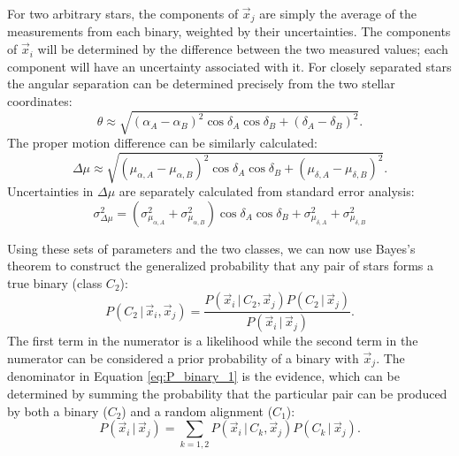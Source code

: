 \documentclass[usenatbib]{mnras}
\newcommand{\given}{\,|\,}
\begin{document}
For two arbitrary stars, the components of $\vec{x}_j$ are simply the average of the measurements from each binary, weighted by their uncertainties. The components of $\vec{x}_i$ will be determined by the difference between the two measured values; each component will have an uncertainty associated with it. For closely separated stars the angular separation can be determined precisely from the two stellar coordinates:
\begin{equation}
\theta \approx \sqrt{(\alpha_A - \alpha_B)^2 \cos \delta_A \cos \delta_B
			 + (\delta_A - \delta_B)^2}.
\end{equation}
The proper motion difference can be similarly calculated:
\begin{equation}
\Delta \mu \approx \sqrt{(\mu_{\alpha, A} - \mu_{\alpha, B})^2 
			\cos \delta_A \cos \delta_B 
			+ (\mu_{\delta, A} - \mu_{\delta, B})^2}.
\end{equation}
Uncertainties in $\Delta \mu$ are separately calculated from standard error analysis:
\begin{equation}
\sigma_{\Delta \mu}^2 = \left( \sigma_{\mu_{\alpha, A}}^2 + \sigma_{\mu_{\alpha, B}}^2 \right) \cos \delta_A \cos \delta_B + \sigma_{\mu_{\delta, A}}^2 + \sigma_{\mu_{\delta, B}}^2  
\end{equation}



Using these sets of parameters and the two classes, we can now use Bayes's theorem to construct the generalized probability that any pair of stars forms a true binary (class $C_2$):
\begin{equation}
P(C_2 \given \vec{x}_i, \vec{x}_j) = \frac{P(\vec{x}_i \given C_2, \vec{x}_j) P(C_2 \given \vec{x}_j)}{P(
\vec{x}_i \given \vec{x}_j)}. \label{eq:P_binary_1}
\end{equation}
The first term in the numerator is a likelihood while the second term in the numerator can be considered a prior probability of a binary with $\vec{x}_j$. The denominator in Equation \ref{eq:P_binary_1} is the evidence, which can be determined by summing the probability that the particular pair can be produced by both a binary ($C_2$) and a random alignment ($C_1$):
\begin{equation}
P(\vec{x}_i \given \vec{x}_j) = \sum_{k=1,2} P(\vec{x}_i \given C_k, \vec{x}_j) P(C_k \given \vec{x}_j).
\end{equation}
\end{document}
